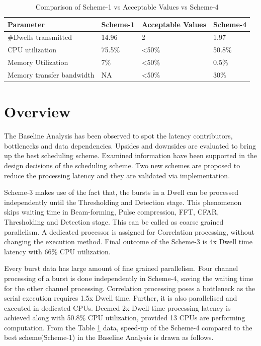 \begin{table}[h!]
	\centering
	\begin{tabular}{|l|l|l|l|} 
	 \hline
	 \textbf{Parameter} & \textbf{Scheme-1} & \textbf{Acceptable Values} & \textbf{Scheme-4}\\
	 \hline
	 \#Dwells transmitted &  14.96 & 2 & 1.97 \\ \hline
	 CPU utilization & 75.5\% & \textless 50\% & 50.8\% \\ \hline
	 Memory Utilization & 7\% & \textless 50\%  & 0.5\% \\ \hline
	 Memory transfer bandwidth & NA & \textless 50\% & 30\%  \\ \hline
	\end{tabular}
	\caption{Comparison of Scheme-1 vs Acceptable Values vs Scheme-4}
	\label{tbl:mm:scheme5_comparison}
\end{table}

\section{Overview}
The Baseline Analysis has been observed to spot the latency contributors, bottlenecks and data dependencies. Upsides and downsides are evaluated to bring up the best scheduling scheme. Examined information have been supported in the design decisions of the scheduling scheme. Two new schemes are proposed to reduce the processing latency and they are validated via implementation. \vspace*{0.2cm}

Scheme-3 makes use of the fact that, the bursts in a Dwell can be processed independently until the Thresholding and Detection stage. This phenomenon skips waiting time in Beam-forming, Pulse compression, FFT, CFAR, Thresholding and Detection stage. This can be called as coarse grained parallelism. A dedicated processor is assigned for Correlation processing, without changing the execution method. Final outcome of the Scheme-3 is 4x Dwell time latency with 66\% CPU utilization. \vspace*{0.2cm}

Every burst data has large amount of fine grained parallelism. Four channel processing of a burst is done independently in Scheme-4, saving the waiting time for the other channel processing.  Correlation processing poses a bottleneck as the serial execution requires 1.5x Dwell time. Further, it is also parallelised and executed in dedicated CPUs. Deemed 2x Dwell time processing latency is achieved along with 50.8\% CPU utilization, provided 13 CPUs are performing computation. From the Table \ref{tbl:mm:scheme5_comparison} data, speed-up of the Scheme-4 compared to the best scheme(Scheme-1) in the Baseline Analysis is drawn as follows. \\


